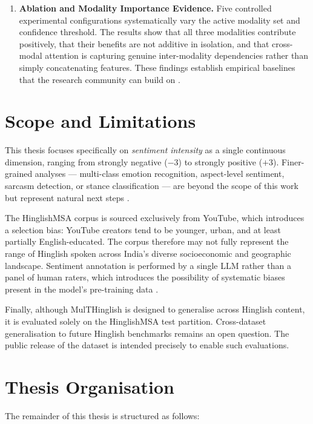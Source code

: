 \begin{enumerate}
    \item \textbf{Ablation and Modality Importance Evidence.} Five controlled experimental configurations systematically vary the active modality set and confidence threshold. The results show that all three modalities contribute positively, that their benefits are not additive in isolation, and that cross-modal attention is capturing genuine inter-modality dependencies rather than simply concatenating features. These findings establish empirical baselines that the research community can build on \cite{liang2021multibench}.
\end{enumerate}

\section{Scope and Limitations}

This thesis focuses specifically on \textit{sentiment intensity} as a single continuous dimension, ranging from strongly negative ($-3$) to strongly positive ($+3$). Finer-grained analyses --- multi-class emotion recognition, aspect-level sentiment, sarcasm detection, or stance classification --- are beyond the scope of this work but represent natural next steps \cite{poria2016convolutional, mardjo2022hyvadrf}.

The HinglishMSA corpus is sourced exclusively from YouTube, which introduces a selection bias: YouTube creators tend to be younger, urban, and at least partially English-educated. The corpus therefore may not fully represent the range of Hinglish spoken across India's diverse socioeconomic and geographic landscape. Sentiment annotation is performed by a single LLM rather than a panel of human raters, which introduces the possibility of systematic biases present in the model's pre-training data \cite{touvron2023llama}.

Finally, although MulTHinglish is designed to generalise across Hinglish content, it is evaluated solely on the HinglishMSA test partition. Cross-dataset generalisation to future Hinglish benchmarks remains an open question. The public release of the dataset is intended precisely to enable such evaluations.

\section{Thesis Organisation}

The remainder of this thesis is structured as follows:

